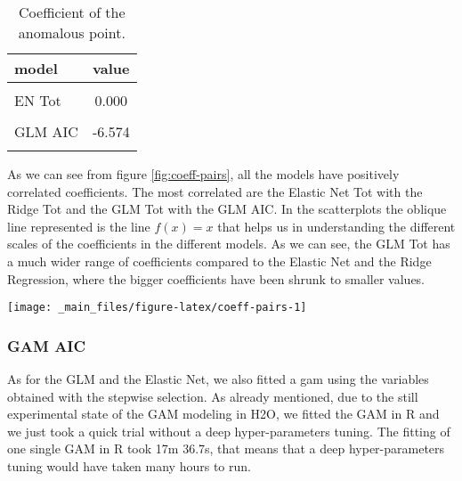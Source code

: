 \documentclass[a4paper, twoside, openright, 12pt]{report}
\let\origfigure\figure
\let\endorigfigure\endfigure
\renewenvironment{figure}[1][2] {
  \expandafter\origfigure\expandafter[!hbtp]
} {
  \endorigfigure
}
\theoremstyle{definition}
\theoremstyle{definition}
\theoremstyle{definition}
\theoremstyle{remark}
\begin{document}
\begin{table}[!h]

\caption{\label{tab:anomalous-point}Coefficient of the anomalous point.}
\centering
\begin{tabular}[t]{lc}
\toprule
\textbf{model} & \textbf{value}\\
\midrule[\heavyrulewidth]
\cellcolor{gray!6}{GLM Tot} & \cellcolor{gray!6}{-6.447}\\
EN Tot & 0.000\\
\cellcolor{gray!6}{Ridge Tot} & \cellcolor{gray!6}{-0.003}\\
GLM AIC & -6.574\\
\cellcolor{gray!6}{EN AIC} & \cellcolor{gray!6}{-0.095}\\
\bottomrule
\end{tabular}
\end{table}

As we can see from figure \ref{fig:coeff-pairs}, all the models have positively correlated coefficients. The most correlated are the Elastic Net Tot with the Ridge Tot and the GLM Tot with the GLM AIC. In the scatterplots the oblique line represented is the line \(f(x)=x\) that helps us in understanding the different scales of the coefficients in the different models. As we can see, the GLM Tot has a much wider range of coefficients compared to the Elastic Net and the Ridge Regression, where the bigger coefficients have been shrunk to smaller values.





\begin{figure}[!hbtp]

{\centering \texttt{[image: \_main\_files/figure-latex/coeff-pairs-1]} 

}

\caption[Coefficients comparison between GLM-based models.]{Coefficients comparison between GLM-based models.}\label{fig:coeff-pairs}
\end{figure}

\hypertarget{gam-aic}{%
\subsubsection{GAM AIC}\label{gam-aic}}

As for the GLM and the Elastic Net, we also fitted a gam using the variables obtained with the stepwise selection. As already mentioned, due to the still experimental state of the GAM modeling in H2O, we fitted the GAM in R and we just took a quick trial without a deep hyper-parameters tuning. The fitting of one single GAM in R took 17m 36.7s, that means that a deep hyper-parameters tuning would have taken many hours to run.
\end{document}
